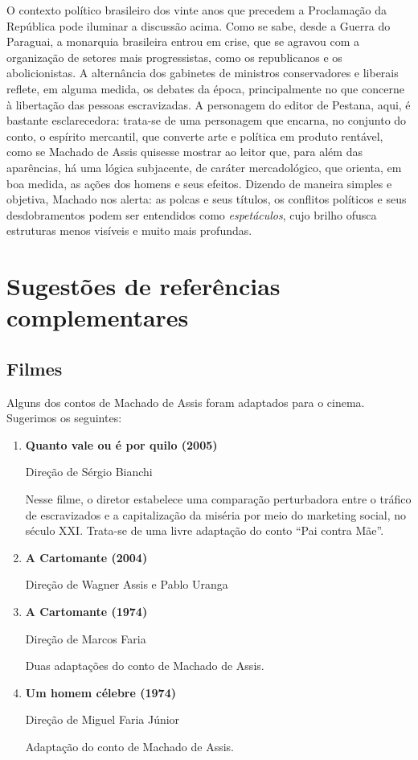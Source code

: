 \documentclass[11pt]{extarticle}
\begin{document}
O contexto político brasileiro dos vinte anos que precedem a Proclamação
da República pode iluminar a discussão acima. Como se sabe, desde a
Guerra do Paraguai, a monarquia brasileira entrou em crise, que se
agravou com a organização de setores mais progressistas, como os
republicanos e os abolicionistas. A alternância dos gabinetes de
ministros conservadores e liberais reflete, em alguma medida, os debates
da época, principalmente no que concerne à libertação das pessoas
escravizadas. A personagem do editor de Pestana, aqui, é bastante
esclarecedora: trata-se de uma personagem que encarna, no conjunto do
conto, o espírito mercantil, que converte arte e política em produto
rentável, como se Machado de Assis quisesse mostrar ao leitor que, para
além das aparências, há uma lógica subjacente, de caráter mercadológico,
que orienta, em boa medida, as ações dos homens e seus efeitos. Dizendo
de maneira simples e objetiva, Machado nos alerta: as polcas e seus
títulos, os conflitos políticos e seus desdobramentos podem ser
entendidos como \emph{espetáculos}, cujo brilho ofusca estruturas menos
visíveis e muito mais profundas.


\section{Sugestões de referências complementares}

\subsection{Filmes}

Alguns dos contos de Machado de Assis foram adaptados para o cinema.
Sugerimos os seguintes:

\begin{enumerate}
\item\textbf{Quanto vale ou é por quilo (2005)}

Direção de Sérgio Bianchi

Nesse filme, o diretor estabelece uma comparação perturbadora entre o
tráfico de escravizados e a capitalização da miséria por meio do
marketing social, no século XXI. Trata-se de uma livre adaptação do
conto ``Pai contra Mãe''.

\item\textbf{A Cartomante (2004)}

Direção de Wagner Assis e Pablo Uranga

\item\textbf{A Cartomante (1974)}

Direção de Marcos Faria

Duas adaptações do conto de Machado de Assis.

\item\textbf{Um homem célebre (1974)}

Direção de Miguel Faria Júnior

Adaptação do conto de Machado de Assis.
\end{enumerate}
\end{document}
